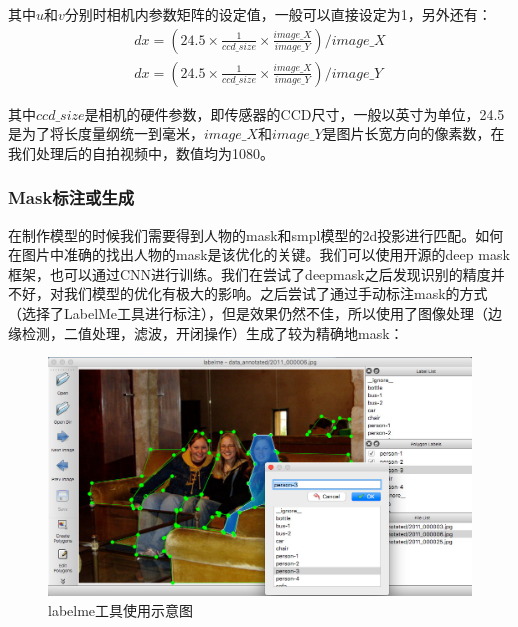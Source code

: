 \documentclass{article}
\begin{document}
其中$u$和$v$分别时相机内参数矩阵的设定值，一般可以直接设定为1，另外还有：
\begin{align}
	dx = (24.5 \times \frac{1}{ccd\_size} \times \frac{image\_X}{image\_Y})/image\_X \\
	dx = (24.5 \times \frac{1}{ccd\_size} \times \frac{image\_X}{image\_Y})/image\_Y
\end{align}
	
其中$ccd\_size$是相机的硬件参数，即传感器的CCD尺寸，一般以英寸为单位，24.5是为了将长度量纲统一到毫米，$image\_X$和$image\_Y$是图片长宽方向的像素数，在我们处理后的自拍视频中，数值均为1080。

\subsubsection{Mask标注或生成}
在制作模型的时候我们需要得到人物的mask和smpl模型的2d投影进行匹配。如何在图片中准确的找出人物的mask是该优化的关键。我们可以使用开源的deep mask框架，也可以通过CNN进行训练。我们在尝试了deepmask\cite{deepmask}之后发现识别的精度并不好，对我们模型的优化有极大的影响。之后尝试了通过手动标注mask的方式（选择了LabelMe\cite{labelme}工具进行标注），但是效果仍然不佳，所以使用了图像处理（边缘检测，二值处理，滤波，开闭操作）生成了较为精确地mask：

\begin{figure}[H]
	\centering
	\includegraphics[width=14cm]{figure/labelme}
	\caption{labelme工具使用示意图}
\end{figure}
\end{document}
